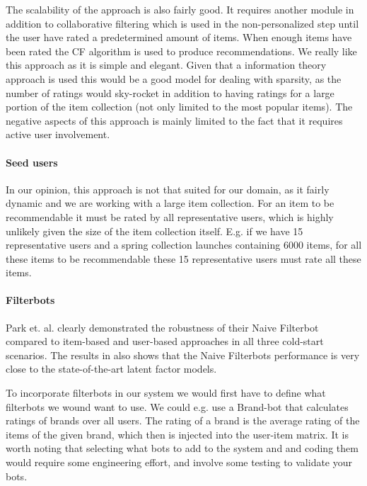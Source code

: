 The scalability of the approach is also fairly good. It requires another module
in addition to collaborative filtering which is used in the non-personalized
step until the user have rated a predetermined amount of items. When enough
items have been rated the CF algorithm is used to produce recommendations. We
really like this approach as it is simple and elegant. Given that a information
theory approach is used this would be a good model for dealing with sparsity,
as the number of ratings would sky-rocket in addition to having ratings for a
large portion of the item collection (not only limited to the most popular
items). The negative aspects of this approach is mainly limited to the fact
that it requires active user involvement.

\paragraph{Seed users}

In our opinion, this approach is not that suited for our domain, as it fairly
dynamic and we are working with a large item collection. For an item to be
recommendable it must be rated by all representative users, which is highly
unlikely given the size of the item collection itself. E.g. if we have 15
representative users and a spring collection launches containing 6000 items,
for all these items to be recommendable these 15 representative users must rate
all these items.

\paragraph{Filterbots}

Park et. al. \cite{Park2006} clearly demonstrated the robustness of their Naive
Filterbot compared to item-based and user-based approaches in all three
cold-start scenarios. The results in \cite{Agarwal2009, Agarwal2010} also shows
that the Naive Filterbots performance is very close to the state-of-the-art
latent factor models.

To incorporate filterbots in our system we would first have to define what
filterbots we wound want to use. We could e.g. use a Brand-bot that calculates
ratings of brands over all users. The rating of a brand is the average rating
of the items of the given brand, which then is injected into the user-item
matrix. It is worth noting that selecting what bots to add to the system and
and coding them would require some engineering effort, and involve some testing
to validate your bots.

